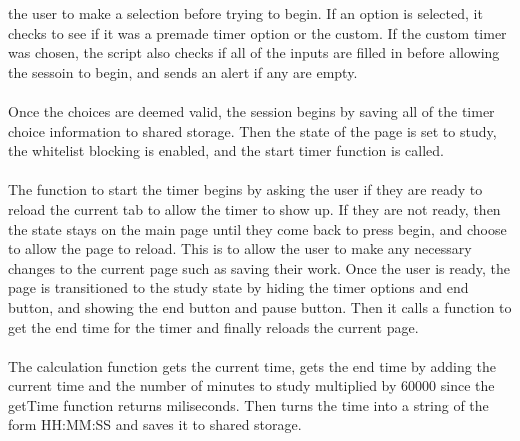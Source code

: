 \documentclass[12pt]{article}
\begin{document}
the user to make a selection before trying to begin. If an option is selected, it checks to see if it was a premade timer option or the custom. 
If the custom timer was chosen, the script also checks if all of the inputs are filled in before allowing the sessoin to begin, and sends an alert if any are empty. 
\\\\Once the choices are deemed valid, the session begins by saving all of the timer choice information to shared storage. 
Then the state of the page is set to study, the whitelist blocking is enabled, and the start timer function is called. 
\\\\The function to start the timer begins by asking the user if they are ready to reload the current tab to allow the timer to show up. 
If they are not ready, then the state stays on the main page until they come back to press begin, and choose to allow the page to reload. 
This is to allow the user to make any necessary changes to the current page such as saving their work. Once the user is ready, the page is transitioned 
to the study state by hiding the timer options and end button, and showing the end button and pause button. 
Then it calls a function to get the end time for the timer and finally reloads the current page. 
\\\\The calculation function gets the current time, gets the end time by adding the current time and the number of minutes to study multiplied by 60000 since the getTime function 
returns miliseconds. Then turns the time into a string of the form HH:MM:SS and saves it to shared storage. 
\\\\
\end{document}

